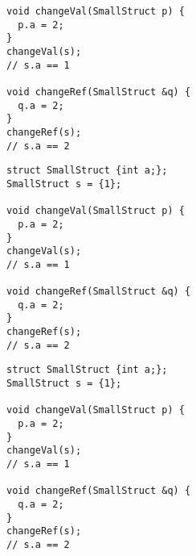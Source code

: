 \begin{frame}[fragile]
\begin{multicols}{2}
\begin{overprint}[\columnwidth]
\begin{verbatim}
void changeVal(SmallStruct p) {
  p.a = 2;
}
changeVal(s);
// s.a == 1

void changeRef(SmallStruct &q) {
  q.a = 2;
}
changeRef(s);
// s.a == 2
      \end{verbatim}
      \begin{verbatim}
struct SmallStruct {int a;};
SmallStruct s = {1};

void changeVal(SmallStruct p) {
  p.a = 2;
}
changeVal(s);
// s.a == 1

void changeRef(SmallStruct &q) {
  q.a = 2;
}
changeRef(s);
// s.a == 2
      \end{verbatim}
      \begin{verbatim}
struct SmallStruct {int a;};
SmallStruct s = {1};

void changeVal(SmallStruct p) {
  p.a = 2;
}
changeVal(s);
// s.a == 1

void changeRef(SmallStruct &q) {
  q.a = 2;
}
changeRef(s);
// s.a == 2
      \end{verbatim}
    \end{overprint}
    \columnbreak
    \null \vfill
    \vfill \null
  \end{multicols}
\end{frame}

